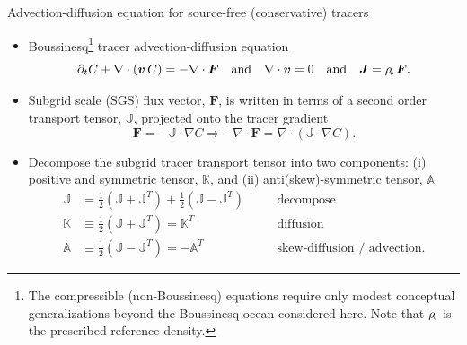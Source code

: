 \documentclass{beamer}
\newcommand{\rhoo}{\rho\mkern-2mu_{\mathsf{\scriptscriptstyle o}}}
\begin{document}
\begin{frame}{Advection-diffusion equation for source-free (conservative) tracers}

\begin{itemize}

\item[$\star$] Boussinesq\footnote{The compressible (non-Boussinesq)
equations require only modest conceptual generalizations beyond the
Boussinesq ocean considered here.  Note that $\rhoo$ is the prescribed
reference density.} tracer advection-diffusion equation
\begin{equation}
    \partial_{t} C  + \nabla \cdot ( {\bm v} \, C)
    = -\nabla \cdot {\bm F} \quad \mbox{and} \quad \nabla \cdot {\bm v} = 0
    \quad \mbox{and} \quad {\bm J} = \rhoo \, {\bm F}.
\end{equation}

\item[$\star$] Subgrid scale (SGS) flux vector, ${\bm F}$, is written
  in terms of a second order transport tensor, $\mathbb{J}$, projected
  onto the tracer gradient
\begin{equation}
  {\bm F}  = -\mathbb{J} \cdot \nabla C
  \Longrightarrow
  -\nabla \cdot {\bm F} = \nabla \cdot (\mathbb{J} \cdot \nabla C). 
\end{equation}

\item[$\star$] Decompose the subgrid tracer transport tensor into two
  components: (i) positive and symmetric tensor, $\mathbb{K}$, and
  (ii) anti(skew)-symmetric tensor, $\mathbb{A}$
  \begin{subequations}
    \begin{alignat}{2}
    \mathbb{J} &=  \tfrac{1}{2} (\mathbb{J} + \mathbb{J}^{T})
     + \tfrac{1}{2} (\mathbb{J} - \mathbb{J}^{T})
     \quad &&\mbox{decompose} 
     \\
     \mathbb{K} &\equiv \tfrac{1}{2} (\mathbb{J} + \mathbb{J}^{T}) =  \mathbb{K}^{T}
     \quad &&\mbox{diffusion}
     \\ 
     \mathbb{A} &\equiv \tfrac{1}{2} (\mathbb{J} - \mathbb{J}^{T}) = -\mathbb{A}^{T}
          \quad &&\mbox{skew-diffusion / advection.}
    \end{alignat}
  \end{subequations}

\end{itemize}

\end{frame}
\end{document}
